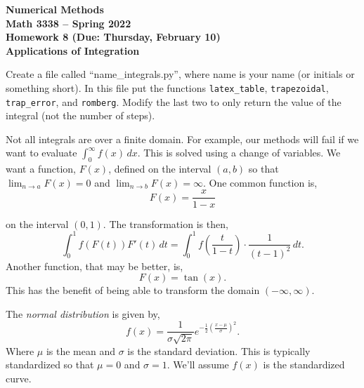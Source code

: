 \documentclass[11pt,letterpaper]{article}
\newcommand{\semester}{Spring 2022}
\newcommand{\due}{Thursday, February 10}
\begin{document}
\begin{center}
{\huge{\bf  Numerical Methods}} \\[1.5ex]
{\bf Math 3338 -- \semester}\\[1.5ex]
{\Large{\bf Homework 8 (Due: \due)\ \\[2ex] Applications of Integration}}\\
\end{center}
\vspace{2mm}




Create a file called ``name\_integrals.py'', where name is your name (or initials or something short).
In this file put the functions \texttt{latex\_table}, \texttt{trapezoidal}, \texttt{trap\_error},
and \texttt{romberg}. Modify the last two to only return the value of the integral (not the number
of steps).


\begin{problem}
 Not all integrals are over a finite domain. For example, our methods will fail if we want to evaluate
$\int_0^{\infty} f(x)\,dx$. This is solved using a change of variables. We want a function, $F(x)$,
defined on the interval $(a,b)$ so that $\lim_{n\rightarrow a} F(x) = 0$ and 
$\lim_{n\rightarrow b} F(x) = \infty$. One common function is,
\[
F(x) = \frac{x}{1-x}
\]
\end{problem}
on the interval $(0,1)$. The transformation is then,
\[
\int_0^1 f(F(t))F'(t)\,dt = \int_0^1 f\left(\frac{t}{1-t}\right)\cdot\frac{1}{(t-1)^2}\,dt.
\]
Another function, that may be better, is,
\[
F(x) = \tan(x).
\]
This has the benefit of being able to transform the domain $(-\infty,\infty)$.

The \emph{normal distribution} is given by,
\[
f(x) = \frac{1}{\sigma\sqrt{2\pi}}e^{-\frac{1}{2}\left(\frac{x-\mu}{\sigma}\right)^2}.
\]
Where $\mu$ is the mean and $\sigma$ is the standard deviation. This is typically standardized
so that $\mu=0$ and $\sigma=1$. We'll assume $f(x)$ is the standardized curve.
\end{document}
